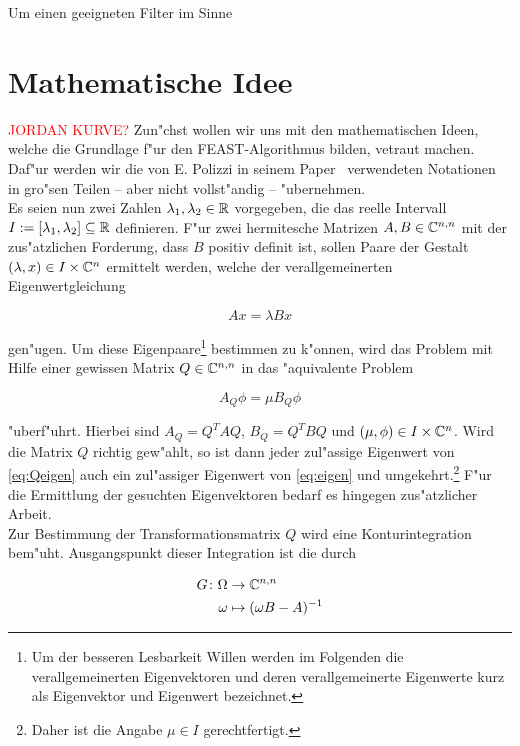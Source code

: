 Um einen geeigneten Filter im Sinne

\section{Mathematische Idee} \label{sec:math}%
\textcolor{red}{JORDAN KURVE?}
Zun"chst wollen wir uns mit den mathematischen Ideen, welche die
Grundlage f"ur den \textsc{FEAST}-Algorithmus bilden, vetraut machen. Daf"ur werden wir
die von E. Polizzi in seinem Paper~\cite{polizzi} verwendeten Notationen in gro"sen
Teilen -- aber nicht vollst"andig -- "ubernehmen.\\

Es seien nun zwei  Zahlen $\lambda_1, \lambda_2 \in \mathbb{R}$ vorgegeben, die
das reelle Intervall $I:=[\lambda_1, \lambda_2] \subseteq \mathbb{R}$ definieren.
F"ur zwei hermitesche Matrizen $A, B \in \mathbb{C}^{n,n}$ mit der zus"atzlichen
Forderung, dass $B$ positiv definit ist, sollen Paare der Gestalt
$(\lambda, x) \in I \times \mathbb{C}^n$ ermittelt werden, welche der verallgemeinerten
Eigenwertgleichung

  \begin{equation}\label{eq:eigen} %
  Ax = \lambda Bx
  \end{equation}

gen"ugen. Um diese Eigenpaare\footnote{Um der besseren Lesbarkeit Willen werden
im Folgenden die verallgemeinerten Eigenvektoren und deren verallgemeinerte
Eigenwerte kurz als Eigenvektor und Eigenwert bezeichnet.}
bestimmen zu k"onnen, wird das Problem mit Hilfe einer
gewissen Matrix $Q\in\mathbb{C}^{n,n}$ in das "aquivalente Problem

  \begin{equation}\label{eq:Qeigen}
  A_Q \phi = \mu B_Q \phi
  \end{equation}

"uberf"uhrt. Hierbei sind $A_Q = Q^TAQ$, $B_Q = Q^TBQ$ und $(\mu, \phi)
\in I\times\mathbb{C}^n$.
Wird die Matrix $Q$ richtig gew"ahlt, so ist dann jeder zul"assige Eigenwert von
\eqref{eq:Qeigen} auch ein zul"assiger Eigenwert von \eqref{eq:eigen} und
umgekehrt.\footnote{Daher ist die Angabe $\mu\in I$ gerechtfertigt.}
F"ur die Ermittlung der gesuchten Eigenvektoren bedarf es hingegen zus"atzlicher Arbeit.\\

Zur Bestimmung der Transformationsmatrix $Q$ wird eine Konturintegration bem"uht.
Ausgangspunkt dieser Integration ist die durch

  \begin{align*}
  G\colon\Omega &\to\mathbb{C}^{n,n}\\
  \omega &\mapsto (\omega B - A)^{-1}
  \end{align*}

